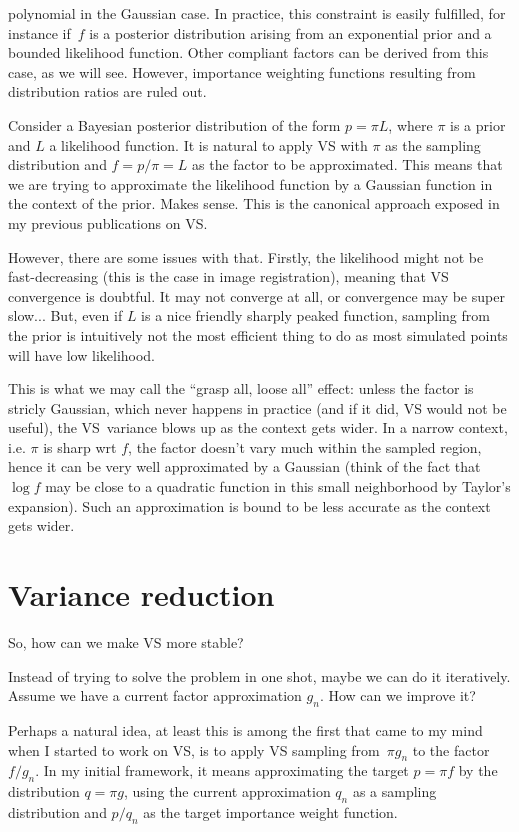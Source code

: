 \documentclass{article}
\begin{document}
polynomial in the Gaussian case. In practice, this constraint is easily fulfilled, for instance if~$f$ is a posterior distribution arising from an exponential prior and a bounded likelihood function. Other compliant factors can be derived from this case, as we will see. However, importance weighting functions resulting from distribution ratios are ruled out.

Consider a Bayesian posterior distribution of the form $p=\pi L$, where $\pi$ is a prior and $L$ a likelihood function. It is natural to apply VS with $\pi$ as the sampling distribution and $f=p/\pi=L$ as the factor to be approximated. This means that we are trying to approximate the likelihood function by a Gaussian function in the context of the prior. Makes sense. This is the canonical approach exposed in my previous publications on VS.

However, there are some issues with that. Firstly, the likelihood might not be fast-decreasing (this is the case in image registration), meaning that VS convergence is doubtful. It may not converge at all, or convergence may be super slow... But, even if $L$ is a nice friendly sharply peaked function, sampling from the prior is intuitively not the most efficient thing to do as most simulated points will have low likelihood.

This is what we may call the ``grasp all, loose all'' effect: unless the factor is stricly Gaussian, which never happens in practice (and if it did, VS would not be useful), the VS~variance blows up as the context gets wider. In a narrow context, i.e. $\pi$ is sharp wrt $f$, the factor doesn't vary much within the sampled region, hence it can be very well approximated by a Gaussian (think of the fact that $\log f$ may be close to a quadratic function in this small neighborhood by Taylor's expansion). Such an approximation is bound to be less accurate as the context gets wider. 


\section{Variance reduction}

So, how can we make VS more stable?

Instead of trying to solve the problem in one shot, maybe we can do it iteratively. Assume we have a current factor approximation $g_n$. How can we improve it?

Perhaps a natural idea, at least this is among the first that came to my mind when I started to work on VS, is to apply VS sampling from~$\pi g_n$ to the factor $f/g_n$. In my initial framework, it means approximating the target $p=\pi f$ by the distribution $q=\pi g$, using the current approximation $q_n$ as a sampling distribution and $p/q_n$ as the target importance weight function.
\end{document}
